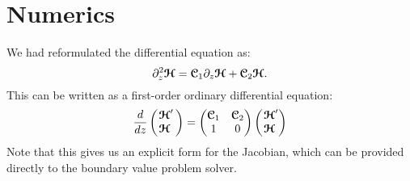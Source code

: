 \clearpage
\section{Numerics}
We had reformulated the differential equation as:
\begin{equation}
  \partial_z^2\bm{\mathcal{H}} = \bm{\mathcal{C}}_1 \partial_z \bm{\mathcal{H}} + \bm{\mathcal{C}}_2 \bm{\mathcal{H}}.
\end{equation}
This can be written as a first-order ordinary differential equation:
\begin{equation}
  \frac{d}{dz}
  \begin{pmatrix}
    \!\phantom{'}\bm{\mathcal{H}}'\, \\
    \!\bm{\mathcal{H}}\,
  \end{pmatrix}
  = 
  \begin{pmatrix}
    \bm{\mathcal{C}}_1 & \bm{\mathcal{C}}_2 \\
    1        & 0
  \end{pmatrix}
  \begin{pmatrix}
    \!\phantom{'}\bm{\mathcal{H}}' \\
    \!\bm{\mathcal{H}}
  \end{pmatrix}
\end{equation}
Note that this gives us an explicit form for the Jacobian, which can be provided directly to the boundary value problem solver.
